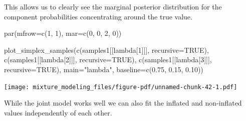 \documentclass[
  letterpaper,
  DIV=11,
  numbers=noendperiod]{scrartcl}
\newenvironment{Shaded}{\begin{snugshade}}{\end{snugshade}}
\newcommand{\AttributeTok}[1]{\textcolor[rgb]{0.40,0.45,0.13}{#1}}
\newcommand{\ConstantTok}[1]{\textcolor[rgb]{0.56,0.35,0.01}{#1}}
\newcommand{\DecValTok}[1]{\textcolor[rgb]{0.68,0.00,0.00}{#1}}
\newcommand{\FloatTok}[1]{\textcolor[rgb]{0.68,0.00,0.00}{#1}}
\newcommand{\FunctionTok}[1]{\textcolor[rgb]{0.28,0.35,0.67}{#1}}
\newcommand{\NormalTok}[1]{\textcolor[rgb]{0.00,0.23,0.31}{#1}}
\newcommand{\OtherTok}[1]{\textcolor[rgb]{0.00,0.23,0.31}{#1}}
\newcommand{\SpecialCharTok}[1]{\textcolor[rgb]{0.37,0.37,0.37}{#1}}
\newcommand{\StringTok}[1]{\textcolor[rgb]{0.13,0.47,0.30}{#1}}
\begin{document}
This allows us to clearly see the marginal posterior distribution for
the component probabilities concentrating around the true value.

\begin{Shaded}
\begin{Highlighting}[]
\FunctionTok{par}\NormalTok{(}\AttributeTok{mfrow=}\FunctionTok{c}\NormalTok{(}\DecValTok{1}\NormalTok{, }\DecValTok{1}\NormalTok{), }\AttributeTok{mar=}\FunctionTok{c}\NormalTok{(}\DecValTok{0}\NormalTok{, }\DecValTok{0}\NormalTok{, }\DecValTok{2}\NormalTok{, }\DecValTok{0}\NormalTok{))}

\FunctionTok{plot\_simplex\_samples}\NormalTok{(}\FunctionTok{c}\NormalTok{(samples1[[}\StringTok{\textquotesingle{}lambda[1]\textquotesingle{}}\NormalTok{]], }\AttributeTok{recursive=}\ConstantTok{TRUE}\NormalTok{),}
                     \FunctionTok{c}\NormalTok{(samples1[[}\StringTok{\textquotesingle{}lambda[2]\textquotesingle{}}\NormalTok{]], }\AttributeTok{recursive=}\ConstantTok{TRUE}\NormalTok{),}
                     \FunctionTok{c}\NormalTok{(samples1[[}\StringTok{\textquotesingle{}lambda[3]\textquotesingle{}}\NormalTok{]], }\AttributeTok{recursive=}\ConstantTok{TRUE}\NormalTok{),}
                     \AttributeTok{main=}\StringTok{"lambda"}\NormalTok{, }\AttributeTok{baseline=}\FunctionTok{c}\NormalTok{(}\FloatTok{0.75}\NormalTok{, }\FloatTok{0.15}\NormalTok{, }\FloatTok{0.10}\NormalTok{))}
\end{Highlighting}
\end{Shaded}

\texttt{[image: mixture\_modeling\_files/figure-pdf/unnamed-chunk-42-1.pdf]}

While the joint model works well we can also fit the inflated and
non-inflated values independently of each other.

\begin{Shaded}
\end{Shaded}
\end{document}
